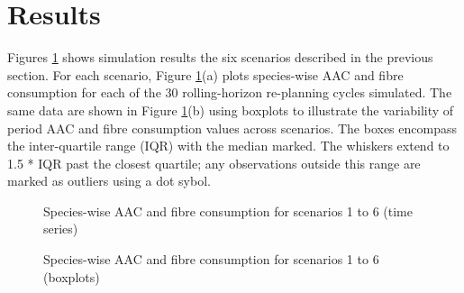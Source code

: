 \section{Results}
\label{sec:results3}

Figures \ref{fig:scenarios} shows simulation results the six scenarios described in the previous section. For each scenario, Figure \ref{fig:scenarios}(a) plots species-wise AAC and fibre consumption for each of the 30 rolling-horizon re-planning cycles simulated. The same data are shown in Figure \ref{fig:scenarios}(b) using boxplots to illustrate the variability of period AAC and fibre consumption values across scenarios. The boxes encompass the inter-quartile range (IQR) with the median marked. The whiskers extend to 1.5 * IQR past the closest quartile; any observations outside this range are marked as outliers using a dot sybol.


\begin{figure}%
  \centering
  \caption{Species-wise AAC and fibre consumption for scenarios 1 to 6 (time series)}%
  \label{fig:scenarios}%
\end{figure}

\begin{figure}%
  \ContinuedFloat
  \centering
  \caption{Species-wise AAC and fibre consumption for scenarios 1 to 6 (boxplots)}%
\end{figure}

